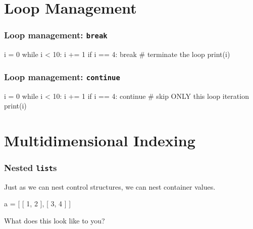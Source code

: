 \documentclass[11pt]{beamer}
\begin{document}
\section{Loop Management}

\begin{frame}[fragile]
  \frametitle{Loop management:  \texttt{break}}
  \Enlarge

  \begin{semiverbatim}
i = 0
while i < 10:
    i += 1
    if i == 4:
        break  # terminate the loop
    print(i)
  \end{semiverbatim}
\end{frame}

\begin{frame}[fragile]
  \frametitle{Loop management:  \texttt{continue}}
  \Enlarge

  \begin{semiverbatim}
i = 0
while i < 10:
    i += 1
    if i == 4:
        continue  # skip ONLY this loop iteration
    print(i)
  \end{semiverbatim}
\end{frame}


\section{Multidimensional Indexing}

\begin{frame}[fragile]
  \frametitle{Nested \texttt{list}s}
  \Enlarge

  \begin{itemize}
  \myitem  Just as we can nest control structures, we can nest container values. %
  \end{itemize}
  \begin{semiverbatim}
a = [ [ 1, 2 ], [ 3, 4 ] ]
  \end{semiverbatim}
  \begin{itemize}
  \myitem  What does this look like to you?
  \end{itemize}
\end{frame}
\end{document}
